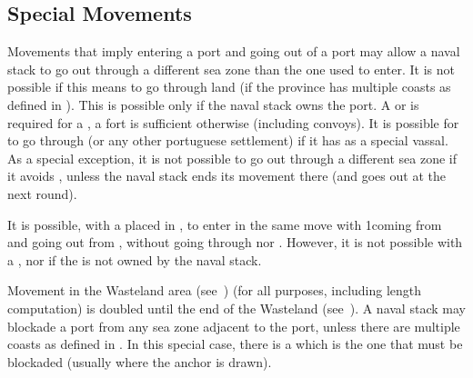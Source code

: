\subsection{Special Movements}\label{chMilitary:Movement:Special Movements}
\label{chMilitary:Movement:Port Multiple
  Coasts} Movements that imply entering a port and going out of a port
may allow a naval stack to go out through a different sea zone than the
one used to enter.
\bparag It is not possible if this means to go through land (if the
province has multiple coasts as defined in ).
\bparag This is possible only if the naval stack owns the port. A \COL
or \TP is required for a \FLEET, a fort is sufficient otherwise
(including convoys).
\bparag[Portugal] It is possible for \SPA to go through  (or any other portuguese settlement) if it has 
as a special vassal.
 As a special exception, it is not possible to go out
through a different sea zone if it avoids , unless the
naval stack ends its movement there (and goes out at the next round).
\begin{exemple}It is possible, with a \TP placed in , to
  enter in the same move with 1\NWD coming from  and
  going out from , without going through
   nor . However, it is not
  possible with a \FLEET, nor if the \TP is not owned by the naval
  stack.
\end{exemple}
\aparag[Wasteland]\label{chMilitary:Movement:Wasteland} Movement in the
Wasteland area (see~) (for all purposes,
including \LoS length computation) is doubled until the end of the
Wasteland (see~).
\label{chMilitary:Movement:Blockading
  Multiple Coasts} A naval stack may blockade a port from any sea zone
adjacent to the port, unless there are multiple coasts as defined in
.
\bparag In this special case, there is a  which is the
one that must be blockaded (usually where the anchor is drawn).

